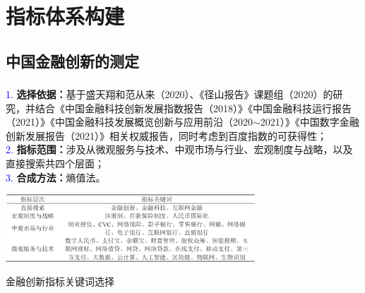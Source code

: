 \documentclass[12pt,aspectratio=169]{ctexbeamer}
\begin{document}
			\section{指标体系构建}
			\subsection{中国金融创新的测定}
			\begin{frame}
				\frametitle{}
					\justifying
					\footnotesize
					\hspace{2em}
					\textcolor{blue}{1.} \textbf{选择依据：}基于盛天翔和范从来（2020）、《径山报告》课题组（2020）的研究，并结合《中国金融科技创新发展指数报告（2018）》《中国金融科技运行报告（2021）》《中国金融科技发展概览创新与应用前沿（2020$\sim$2021）》《中国数字金融创新发展报告（2021）》相关权威报告，同时考虑到百度指数的可获得性；\\
					\hspace{2em}
					\textcolor{blue}{2.} \textbf{指标范围：}涉及从微观服务与技术、中观市场与行业、宏观制度与战略，以及直接搜索共四个层面；\\
					\hspace{2em}
					\textcolor{blue}{3.} \textbf{合成方法：}熵值法。
				\begin{table}
					\centering
					\includegraphics[width=0.7\textwidth]{figures/tab.2-1}
					\caption{金融创新指标关键词选择}
					\label{fi}
				\end{table}
			\end{frame}
\end{document}
